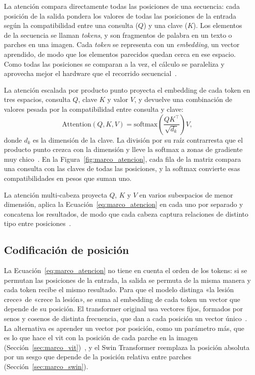 La atención compara directamente todas las posiciones de una secuencia: cada posición de la salida pondera
los valores de todas las posiciones de la entrada según la compatibilidad entre una consulta ($Q$) y una clave
($K$). Los elementos de la secuencia se llaman \emph{tokens}, y son fragmentos de palabra en un texto o parches
en una imagen. Cada \emph{token} se representa con un \emph{embedding}, un vector aprendido, de modo que los
elementos parecidos quedan cerca en ese espacio. Como todas las posiciones se comparan a la vez, el cálculo se
paraleliza y aprovecha mejor el hardware que el recorrido secuencial~\cite{vaswani2017attention}.

La atención escalada por producto punto proyecta el embedding de cada token en tres espacios,
consulta $Q$, clave $K$ y valor $V$, y devuelve una combinación de valores pesada por la compatibilidad entre
consulta y clave:
\begin{equation}
    \mathrm{Attention}(Q, K, V) = \mathrm{softmax}\!\left(\frac{QK^{\top}}{\sqrt{d_k}}\right) V,
    \label{eq:marco_atencion}
\end{equation}
donde $d_k$ es la dimensión de la clave. La división por su raíz contrarresta que el producto punto
crezca con la dimensión y lleve la softmax a zonas de gradiente muy chico~\cite{vaswani2017attention}. En la Figura~\ref{fig:marco_atencion}, cada
fila de la matriz compara una consulta con las claves de todas las posiciones, y la softmax convierte esas
compatibilidades en pesos que suman uno.



La atención multi-cabeza proyecta $Q$, $K$ y $V$ en varios subespacios de menor dimensión, aplica
la Ecuación~\ref{eq:marco_atencion} en cada uno por separado y concatena los resultados, de modo que cada
cabeza captura relaciones de distinto tipo entre posiciones~\cite{vaswani2017attention}.

\subsection{Codificación de posición}
\label{sec:marco_posicion}

La Ecuación~\ref{eq:marco_atencion} no tiene en cuenta el orden de los tokens: si se permutan las posiciones de
la entrada, la salida se permuta de la misma manera y cada token recibe el mismo resultado. Para que el modelo
distinga «la lesión crece» de «crece la lesión», se suma al embedding de cada token un vector que depende de su
posición. El transformer original usa vectores fijos, formados por senos y cosenos de distinta frecuencia,
que dan a cada posición un vector único~\cite{vaswani2017attention}. La alternativa es aprender un vector por
posición, como un parámetro más, que es lo que hace el \gls{vit} con la posición de cada parche en la imagen
(Sección~\ref{sec:marco_vit})~\cite{dosovitskiy2021image}, y el Swin Transformer reemplaza la posición absoluta
por un sesgo que depende de la posición relativa entre parches (Sección~\ref{sec:marco_swin}).

